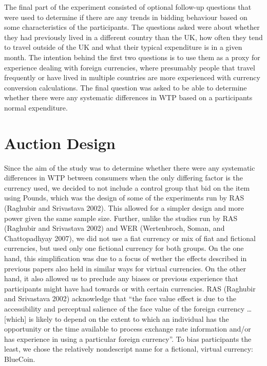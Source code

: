 \documentclass[
]{report}
\begin{document}
The final part of the experiment consisted of optional follow-up
questions that were used to determine if there are any trends in bidding
behaviour based on some characteristics of the participants. The
questions asked were about whether they had previously lived in a
different country than the UK, how often they tend to travel outside of
the UK and what their typical expenditure is in a given month. The
intention behind the first two questions is to use them as a proxy for
experience dealing with foreign currencies, where presumably people that
travel frequently or have lived in multiple countries are more
experienced with currency conversion calculations. The final question
was asked to be able to determine whether there were any systematic
differences in WTP based on a participants normal expenditure.

\section{Auction Design}\label{auction-design}

Since the aim of the study was to determine whether there were any
systematic differences in WTP between consumers when the only differing
factor is the currency used, we decided to not include a control group
that bid on the item using Pounds, which was the design of some of the
experiments run by RAS (Raghubir and Srivastava 2002). This allowed for
a simpler design and more power given the same sample size. Further,
unlike the studies run by RAS (Raghubir and Srivastava 2002) and WER
(Wertenbroch, Soman, and Chattopadhyay 2007), we did not use a fiat
currency or mix of fiat and fictional currencies, but used only one
fictional currency for both groups. On the one hand, this simplification
was due to a focus of wether the effects described in previous papers
also held in similar ways for virtual currencies. On the other hand, it
also allowed us to preclude any biases or previous experience that
participants might have had towards or with certain currencies. RAS
(Raghubir and Srivastava 2002) acknowledge that ``the face value effect
is due to the accessibility and perceptual salience of the face value of
the foreign currency \ldots{} {[}which{]} is likely to depend on the
extent to which an individual has the opportunity or the time available
to process exchange rate information and/or has experience in using a
particular foreign currency''. To bias participants the least, we chose
the relatively nondescript name for a fictional, virtual currency:
BlueCoin.
\end{document}
